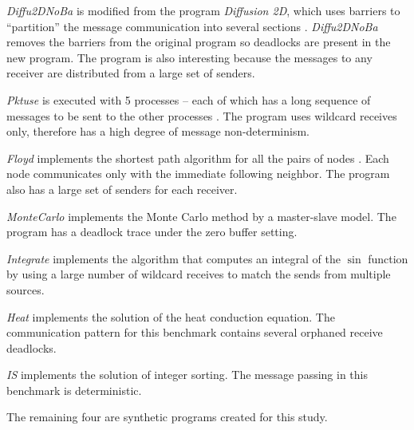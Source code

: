 \begin{compactitem}

\item \textit{Diffu2DNoBa} is modified from the program \textit{Diffusion 2D}, which uses barriers to “partition” the message communication into several sections \cite{benchmark:fevs}. \textit{Diffu2DNoBa} removes the barriers from the original program so deadlocks are present in the new program. The program is also interesting because the messages to any receiver are distributed from a large set of senders.

\item \textit{Pktuse} is executed with 5 processes -- each of which has a long sequence of messages to be sent to the other processes \cite{mpptest_benchmark}. The program uses wildcard receives only, therefore has a high degree of message non-determinism. 

\item \textit{Floyd} implements the shortest path algorithm for all the pairs of nodes \cite{DBLP:conf/ppopp/XueLWGCZZV09}. Each node communicates only with the immediate following neighbor. The program also has a large set of senders for each receiver. 


\item \textit{MonteCarlo} \cite{benchmark:mentoCarlo} implements the Monte Carlo method by a master-slave model. The program has a deadlock trace under the zero buffer setting.

\item \textit{Integrate} \cite{benchmark:fevs} implements the algorithm that computes an integral of the $\sin$ function by using a large number of wildcard receives to match the sends from multiple sources.

\item \textit{Heat} \cite{Mueller:SC2011} implements the solution of the heat conduction equation. The communication pattern for this benchmark contains several orphaned receive deadlocks.

\item \textit{IS} \cite{Bailey1991} implements the solution of integer sorting. The message passing in this benchmark is deterministic.
\end{compactitem}

The remaining four are synthetic programs created for this study.

